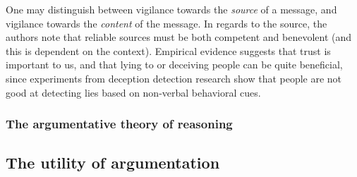 One may distinguish between vigilance towards the \emph{source} of a message, and vigilance towards the \emph{content} of the message.
In regards to the source, the authors note that reliable sources must be both competent and benevolent (and this is dependent on the context).
Empirical evidence suggests that trust is important to us, and that lying to or deceiving people can be quite beneficial, since experiments from deception detection research show that people are not good at detecting lies based on non-verbal behavioral cues.

\subsubsection{The argumentative theory of reasoning}

\subsection{The utility of argumentation}
